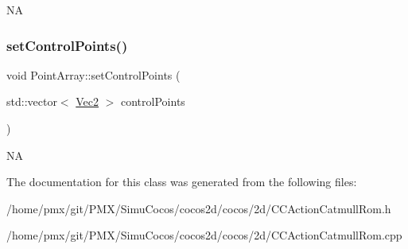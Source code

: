 NA \mbox{\label{classPointArray_a6ce3aef1e303ff3f2bb9e50e0075e5ba}} 
\subsubsection{\texorpdfstring{set\+Control\+Points()}{setControlPoints()}\hspace{0.1cm}{\footnotesize\ttfamily [2/2]}}
{\footnotesize\ttfamily void Point\+Array\+::set\+Control\+Points (\begin{DoxyParamCaption}\item[{std\+::vector$<$ \hyperlink{classVec2}{Vec2} $>$}]{control\+Points }\end{DoxyParamCaption})}

NA 

The documentation for this class was generated from the following files\+:\begin{DoxyCompactItemize}
\item 
/home/pmx/git/\+P\+M\+X/\+Simu\+Cocos/cocos2d/cocos/2d/C\+C\+Action\+Catmull\+Rom.\+h\item 
/home/pmx/git/\+P\+M\+X/\+Simu\+Cocos/cocos2d/cocos/2d/C\+C\+Action\+Catmull\+Rom.\+cpp\end{DoxyCompactItemize}
